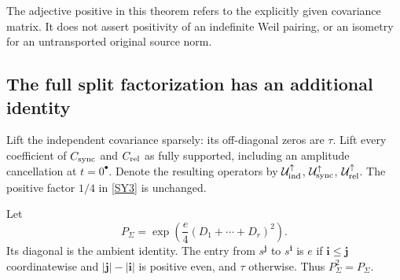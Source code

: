 \documentclass[11pt,a4paper]{article}
\theoremstyle{definition}\newtheorem{definition}[theorem]{Definition}
\begin{document}
The adjective positive in this theorem refers to the explicitly given covariance matrix. It does not assert positivity of an indefinite Weil pairing, or an isometry for an untransported original source norm.

\subsection{The full split factorization has an additional identity}
Lift the independent covariance sparsely: its off-diagonal zeros are $\tau$. Lift every coefficient of $C_{\rm sync}$ and $C_{\rm rel}$ as fully supported, including an amplitude cancellation at $t=0^\bullet$. Denote the resulting operators by $\mathcal U_{\rm ind}^{\uparrow}$, $\mathcal U_{\rm sync}^{\uparrow}$, $\mathcal U_{\rm rel}^{\uparrow}$. The positive factor $1/4$ in \eqref{SY3} is unchanged.

Let
\begin{equation}
 P_\Sigma=\exp\left(\frac e4(D_1+\cdots+D_r)^2\right).
                                                               \tag{SY7}\label{SY7}
\end{equation}
Its diagonal is the ambient identity. The entry from $s^{\boldsymbol j}$ to $s^{\boldsymbol i}$ is $e$ if $\boldsymbol i\le\boldsymbol j$ coordinatewise and $|\boldsymbol j|-|\boldsymbol i|$ is positive even, and $\tau$ otherwise. Thus $P_\Sigma^2=P_\Sigma$.
\end{document}
